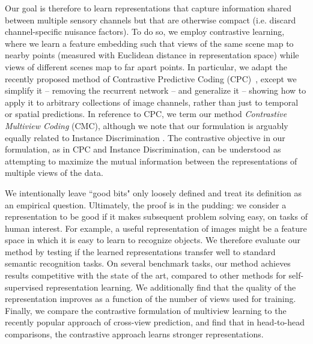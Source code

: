 \documentclass[10pt,twocolumn,letterpaper]{article}
\newcommand{\citep}[1]{\cite{#1}}
\begin{document}
Our goal is therefore to learn representations that capture information shared between multiple sensory channels but that are otherwise compact (i.e. discard channel-specific nuisance factors). To do so, we employ contrastive learning, where we learn a feature embedding such that views of the same scene map to nearby points (measured with Euclidean distance in representation space) while views of different scenes map to far apart points. In particular, we adapt the recently proposed method of Contrastive Predictive Coding (CPC)~\cite{oord2018representation}, except we simplify it -- removing the recurrent network -- and generalize it -- showing how to apply it to arbitrary collections of image channels, rather than just to temporal or spatial predictions. In reference to CPC, we term our method \emph{Contrastive Multiview Coding} (CMC), although we note that our formulation is arguably equally related to Instance Discrimination \citep{wu2018unsupervised}. 
The contrastive objective in our formulation, as in CPC and Instance Discrimination, can be understood as attempting to maximize the mutual information between the representations of multiple views of the data.

We intentionally leave ``good bits" only loosely defined and treat its definition as an empirical question. Ultimately, the proof is in the pudding: we consider a representation to be good if it makes subsequent problem solving easy, on tasks of human interest. For example, a useful representation of images might be a feature space in which it is easy to learn to recognize objects. We therefore evaluate our method by testing if the learned representations transfer well to standard semantic recognition tasks. On several benchmark tasks, our method achieves results competitive with the state of the art, compared to other methods for self-supervised representation learning. We additionally find that the quality of the representation improves as a function of the number of views used for training. Finally, we compare the contrastive formulation of multiview learning to the recently popular approach of cross-view prediction, and find that in head-to-head comparisons, the contrastive approach learns stronger representations.
\end{document}
